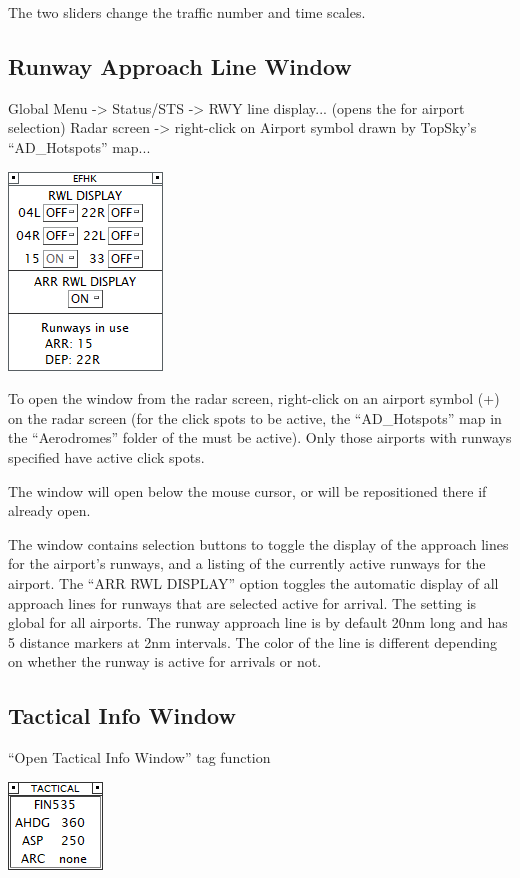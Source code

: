 \documentclass[11pt,a4paper,oldfontcommands]{memoir}
\begin{document}
The two sliders change the traffic number and time scales.

\subsection{Runway Approach Line Window}
\label{win:ralw}

Global Menu -> Status/STS -> RWY line display... (opens the \textit{} for airport selection)
Radar screen -> right-click on Airport symbol drawn by TopSky’s “AD\_Hotspots” map...

\includegraphics{img/rwydsp.png}

To open the window from the radar screen, right-click on an airport symbol (+) on the radar screen (for the click spots to be active, the “AD\_Hotspots” map in the “Aerodromes” folder of the \textit{} must be active). Only those airports with runways specified have active click spots.

The window will open below the mouse cursor, or will be repositioned there if already open.

The window contains selection buttons to toggle the display of the approach lines for the airport’s runways, and a listing of the currently active runways for the airport. The “ARR RWL DISPLAY” option toggles the automatic display of all approach lines for runways that are selected active for arrival. The setting is global for all airports. The runway approach line is by default 20nm long and has 5 distance markers at 2nm intervals. The color of the line is different depending on whether the runway is active for arrivals or not.

\subsection{Tactical Info Window}
\label{win:tiw}

“Open Tactical Info Window” tag function

\includegraphics{img/tiw.png}
\end{document}
